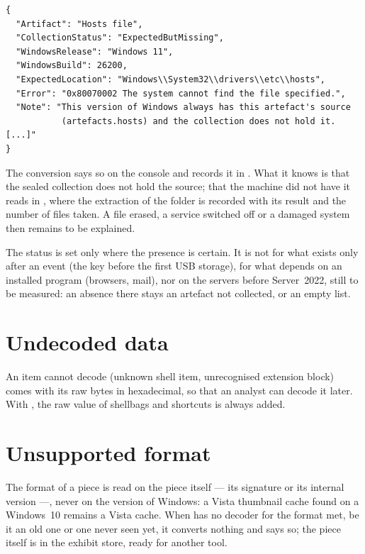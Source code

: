 \documentclass[11pt,a4paper,oneside]{report}
\begin{document}
\begin{lstlisting}
{
  "Artifact": "Hosts file",
  "CollectionStatus": "ExpectedButMissing",
  "WindowsRelease": "Windows 11",
  "WindowsBuild": 26200,
  "ExpectedLocation": "Windows\\System32\\drivers\\etc\\hosts",
  "Error": "0x80070002 The system cannot find the file specified.",
  "Note": "This version of Windows always has this artefact's source
           (artefacts.hosts) and the collection does not hold it. [...]"
}
\end{lstlisting}

The conversion says so on the console and records it in
. What it knows is that the sealed collection does not
hold the source; that the machine did not have it reads in
, where the extraction of the folder is recorded
with its result and the number of files taken. A file erased, a service
switched off or a damaged system then remains to be explained.

\begin{attention}
The status is set only where the presence is certain. It is not for what
exists only after an event (the  key before the first USB
storage), for what depends on an installed program (browsers, mail), nor on
the servers before Server~2022, still to be measured: an absence there stays an
artefact not collected, or an empty list.
\end{attention}

\section{Undecoded data}

An item \wac{} cannot decode (unknown shell item, unrecognised extension block)
comes with its raw bytes in hexadecimal, so that an analyst can decode it later.
With , the raw value of shellbags and shortcuts is always added.

\section{Unsupported format}\label{sec:format}

The format of a piece is read on the piece itself --- its signature or its
internal version ---, never on the version of Windows: a Vista thumbnail cache
found on a Windows~10 remains a Vista cache. When \wac{} has no decoder for the
format met, be it an old one or one never seen yet, it converts nothing and
says so; the piece itself is in the exhibit store, ready for another tool.
\end{document}

